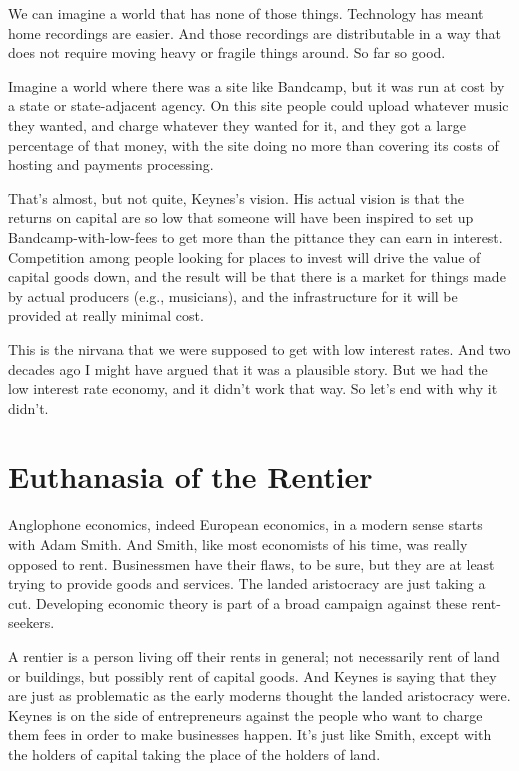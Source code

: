 \documentclass[
  11pt,
  letterpaper,
  DIV=11,
  numbers=noendperiod,
  oneside]{scrartcl}
\begin{document}
We can imagine a world that has none of those things. Technology has
meant home recordings are easier. And those recordings are distributable
in a way that does not require moving heavy or fragile things around. So
far so good.

Imagine a world where there was a site like Bandcamp, but it was run at
cost by a state or state-adjacent agency. On this site
people could upload whatever music they wanted, and charge whatever they
wanted for it, and they got a large percentage of that money, with the
site doing no more than covering its costs of hosting and payments
processing.

That's almost, but not quite, Keynes's vision. His actual vision is that
the returns on capital are so low that someone will have been inspired
to set up Bandcamp-with-low-fees to get more than the pittance they can
earn in interest. Competition among people looking for places to invest
will drive the value of capital goods down, and the result will be that
there is a market for things made by actual producers (e.g., musicians),
and the infrastructure for it will be provided at really minimal cost.

This is the nirvana that we were supposed to get with low interest
rates. And two decades ago I might have argued that it was a plausible
story. But we had the low interest rate economy, and it didn't work that
way. So let's end with why it didn't.

\section{Euthanasia of the Rentier}\label{euthanasia-of-the-rentier}

Anglophone economics, indeed European economics, in a modern sense
starts with Adam Smith. And Smith, like most economists of his time, was
really opposed to rent. Businessmen have their flaws, to be sure, but
they are at least trying to provide goods and services. The landed
aristocracy are just taking a cut. Developing economic theory is part of
a broad campaign against these rent-seekers.

A rentier is a person living off their rents in general; not necessarily
rent of land or buildings, but possibly rent of capital goods. And
Keynes is saying that they are just as problematic as the early moderns
thought the landed aristocracy were. Keynes is on the side of
entrepreneurs against the people who want to charge them fees in order
to make businesses happen. It's just like Smith, except with the holders
of capital taking the place of the holders of land.
\end{document}
